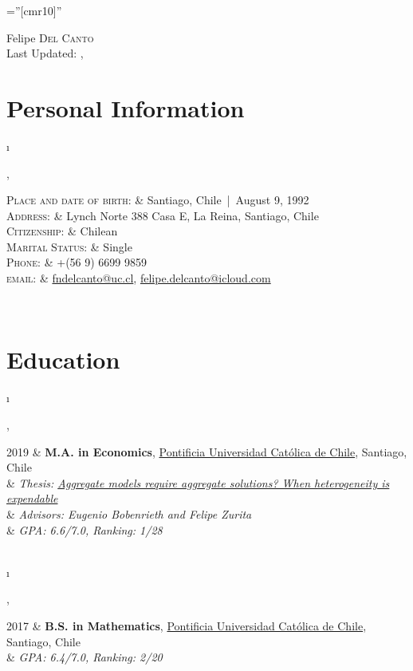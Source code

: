 \documentclass[a4paper, margins=2cm,10pt]{article}
\newcommand{\tablength}{}
\newcommand{\setTabParams}[1]{\renewcommand\tablength{}\forcsvlist{\listadd\tablength}{#1}}
\newcommand{\setCols}[1]{			%
	\ifnum0=\i						%
		\ifdim0cm=#1				%
			\def \firstCol {r}		%
		\else						%
			\def \firstCol {p{#1}}		%
		\fi						%
	\else \ifnum1=\i				%
		\ifdim0cm=#1				%
			\def \secondCol {l}		%
		\else						%
			\def \secondCol{p{#1}}	%
		\fi						%
	\else \ifnum2=\i				%
		\ifnum0=#1				%
			\def \sep {}			%
		\else						%
			\def \sep {|}			%
		\fi						%
	\fi \fi \fi						%
	\advance\i by1					%
}
\newcommand{\tab}[1]{					%
	\newcount\i						%
	\forlistloop{\setCols}{\tablength}		%
	\begin{tabular}{\firstCol \sep \secondCol}	%
		#1							%
	\end{tabular} \\						%
}
\begin{document}
\pagestyle{empty} %

\font\fb=''[cmr10]'' %

\par{\centering
		{{\Huge Felipe \textsc{Del Canto}}	\\[0.5ex]
		 {\large Last Updated: \monthname, \the\year }
	}\par}

\section{Personal Information}
\setTabParams{0cm,0cm,0}

\tab{
    \textsc{Place and date of birth:}	&	Santiago, Chile\,  |\, August 9, 1992								\\[0.2ex]
    \textsc{Address:}   			&	Lynch Norte 388 Casa E, La Reina, Santiago, Chile					\\[0.2ex]
    \textsc{Citizenship:}			&	Chilean													\\[0.2ex]
    \textsc{Marital Status:}			&	Single													\\[0.2ex]
    \textsc{Phone:}	   			&	+(56 9) 6699 9859											\\[0.2ex]
    \textsc{email:}     				&	\href{mailto:fndelcanto@uc.cl}{fndelcanto@uc.cl},
    								\href{mailto:felipe.delcanto@icloud.com}{felipe.delcanto@icloud.com}
}

\section{Education}
\setTabParams{0cm,0cm,0}

\tab{
\textsc{2019}
	&	\textbf{M.A. in Economics}, \href{https://economia.uc.cl/programas-academicos/magister-en-economia/}{Pontificia Universidad Católica de Chile}, Santiago, Chile	\\[0.2ex]
	&	\emph{\quad Thesis: \href{https://economia.uc.cl/wp-content/uploads/2020/01/tesis-DelCanto-2019.pdf}{Aggregate models require aggregate solutions? When heterogeneity is expendable}}	\\[0.2ex]
	&	\emph{\quad Advisors: Eugenio Bobenrieth and Felipe Zurita}	\\[0.2ex]
	&	\emph{\quad GPA: 6.6/7.0, Ranking: 1/28}
}

\tab{
\textsc{2017}
	& 	\textbf{B.S. in Mathematics}, \href{http://www.mat.uc.cl/?lang=en}{Pontificia Universidad Católica de Chile}, Santiago, Chile\\
	&	\emph{\quad GPA: 6.4/7.0, Ranking: 2/20}
}
\end{document}
